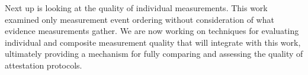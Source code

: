 \documentclass[runningheads]{llncs}
\theoremstyle{definition}
\begin{document}
Next up is looking at the quality of individual measurements.  This
work examined only measurement event ordering without consideration of
what evidence measurements gather.  We are now working on techniques for
evaluating individual and composite measurement quality that will
integrate with this work, ultimately providing a mechanism for fully
comparing and assessing the quality of attestation protocols.






%
% 
%
%
%

%

%
\end{document}
